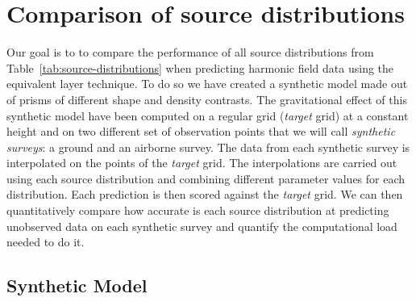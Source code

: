 \documentclass[twocolumn]{article}
\begin{document}

\section{Comparison of source distributions}


Our goal is to to compare the performance of all source distributions from
Table~\ref{tab:source-distributions} when predicting harmonic field data using
the equivalent layer technique.
To do so we have created a synthetic model made out of prisms of different
shape and density contrasts.
The gravitational effect of this synthetic model have been computed on
a regular grid (\emph{target} grid) at a constant height and on two different
set of observation points that we will call \emph{synthetic surveys}: a ground
and an airborne survey.
The data from each synthetic survey is interpolated on the points of the
\emph{target} grid.
The interpolations are carried out using each source distribution and combining
different parameter values for each distribution.
Each prediction is then scored against the \emph{target} grid.
We can then quantitatively compare how accurate is each source distribution at
predicting unobserved data on each synthetic survey and quantify the
computational load needed to do it.

\subsection{Synthetic Model}

\end{document}
